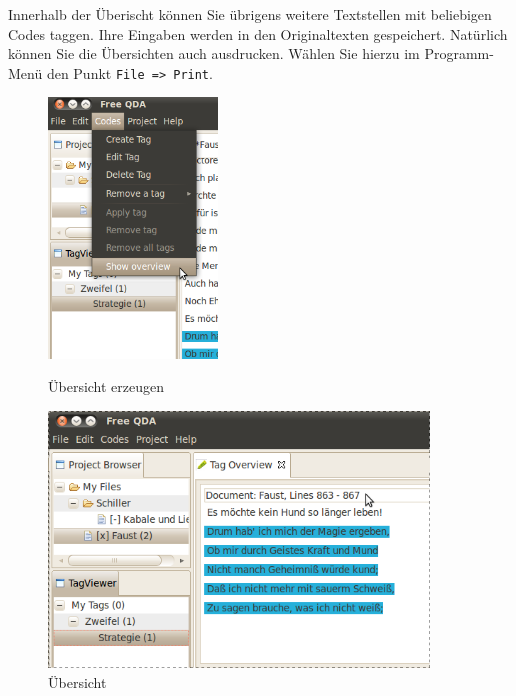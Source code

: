 Innerhalb der Überischt können Sie übrigens weitere Textstellen mit beliebigen Codes taggen. Ihre Eingaben werden in den Originaltexten gespeichert.
Natürlich können Sie die Übersichten auch ausdrucken. Wählen Sie hierzu im Programm-Menü den Punkt \texttt{File => Print}.

\begin{figure}[!hbt]
\begin{minipage}[!hb!]{0.5\textwidth}\scriptsize
	\centering
	 \includegraphics[width=0.4\textwidth]{img/showoverview}
	\caption{Übersicht erzeugen}
	\label{fig:overview1}
\end{minipage}
\hfill
\begin{minipage}[!hb!]{0.5\textwidth}
	\centering
	 \includegraphics[width=0.9\textwidth]{img/overview1}
	\caption{Übersicht}
	\label{fig:overview2}
\end{minipage}
\end{figure}

